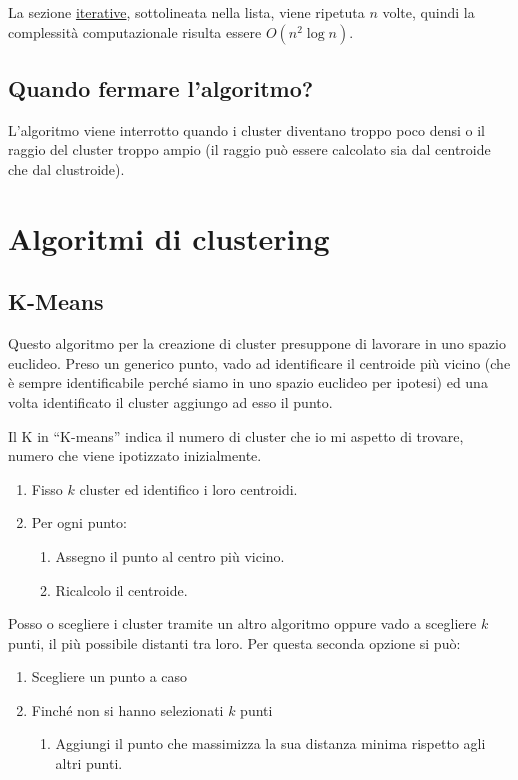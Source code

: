 \documentclass[\main/main.tex]{subfiles}
\begin{document}
La sezione \underline{iterative}, sottolineata nella lista, viene ripetuta $n$ volte, quindi la complessità computazionale risulta essere $O(n^2\log n)$.

\subsection{Quando fermare l'algoritmo?}
L'algoritmo viene interrotto quando i cluster diventano troppo poco densi o il raggio del cluster troppo ampio (il raggio può essere calcolato sia dal centroide che dal clustroide).

\section{Algoritmi di clustering}

\subsection{K-Means}
Questo algoritmo per la creazione di cluster presuppone di lavorare in uno spazio euclideo. Preso un generico punto, vado ad identificare il centroide più vicino (che è sempre identificabile perché siamo in uno spazio euclideo per ipotesi) ed una volta identificato il cluster aggiungo ad esso il punto.

Il K in ``K-means'' indica il numero di cluster che io mi aspetto di trovare, numero che viene ipotizzato inizialmente.

\begin{enumerate}
  \item Fisso $k$ cluster ed identifico i loro centroidi.
  \item Per ogni punto:
        \begin{enumerate}
          \item Assegno il punto al centro più vicino.
          \item Ricalcolo il centroide.
        \end{enumerate}
\end{enumerate}

Posso o scegliere i cluster tramite un altro algoritmo oppure vado a scegliere $k$ punti, il più possibile distanti tra loro. Per questa seconda opzione si può:

\begin{enumerate}
  \item Scegliere un punto a caso
  \item Finché non si hanno selezionati $k$ punti
        \begin{enumerate}
          \item Aggiungi il punto che massimizza la sua distanza minima rispetto agli altri punti.
        \end{enumerate}
\end{enumerate}
\end{document}
